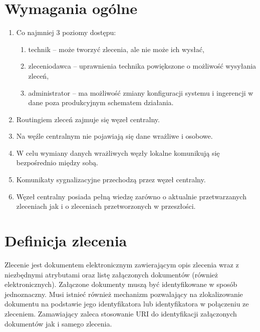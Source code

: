 \documentclass[a4paper]{report}
\begin{document}
\section{Wymagania ogólne}
\begin{enumerate}
\item Co najmniej 3 poziomy dostępu:
        \begin{enumerate}
        \item technik -- może tworzyć zlecenia, ale nie może ich wysłać,
        \item zleceniodawca -- uprawnienia technika powiększone o możliwość wysyłania zleceń,
        \item administrator -- ma możliwość zmiany konfiguracji systemu i ingerencji w dane poza produkcyjnym schematem działania.
        \end{enumerate}
\item Routingiem zleceń zajmuje się węzeł centralny.
\item Na węźle centralnym nie pojawiają się dane wrażliwe i osobowe.
\item W celu wymiany danych wrażliwych węzły lokalne komunikują się bezpośrednio między sobą.
\item Komunikaty sygnalizacyjne przechodzą przez węzeł centralny.
\item Węzeł centralny posiada pełną wiedzę zarówno o aktualnie przetwarzanych zleceniach jak i o zleceniach przetworzonych w przeszłości.
\end{enumerate}

\section{Definicja zlecenia}

Zlecenie jest dokumentem elektronicznym zawierającym opis zlecenia wraz z niezbędnymi atrybutami oraz listę załączonych dokumentów (również elektronicznych). Załączone dokumenty muszą być identyfikowane w sposób jednoznaczny. Musi istnieć również mechanizm pozwalający na zlokalizowanie dokumentu na podstawie jego identyfikatora lub identyfikatora w połączeniu ze zleceniem. Zamawiający zaleca stosowanie URI do identyfikacji załączonych dokumentów jak i samego zlecenia.
\end{document}
